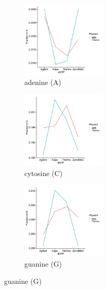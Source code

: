 \documentclass[parskip=full, numbers=noenddot]{scrreprt}
\begin{document}
\begin{figure}[h]
  \centering
  \begin{subfigure}[h]{0.45\textwidth}
    \centering
    \includegraphics[width=0.45\textwidth]{linearmodel_a}
    \caption{adenine (A)}
    \label{fig:linearmodel_a}
  \end{subfigure}
  \begin{subfigure}[h]{0.45\textwidth}
    \centering
    \includegraphics[width=0.45\textwidth]{linearmodel_c}
    \caption{cytosine (C)}
    \label{fig:linearmodel_c}
  \end{subfigure}
  \begin{subfigure}[h]{0.45\textwidth}
    \centering
    \includegraphics[width=0.45\textwidth]{linearmodel_g}
    \caption{guanine (G)}
    \label{fig:linearmodel_g}
  \end{subfigure}

\end{figure}
\end{document}
